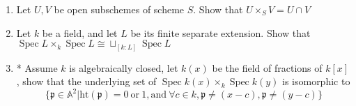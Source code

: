 \documentclass[a4paper,11pt]{article}
\def\bb#1{\mathbb{#1}}
\def\mrm#1{\mathrm{#1}}
\DeclareMathOperator{\Spec}{Spec}
\begin{document}
\begin{enumerate}[1.]
\begin{enumerate}
    \item Let $U,V$ be open subschemes of scheme $S$. Show that $U\times_S V=U\cap V$
    \item Let $k$ be a field, and let $L$ be its finite separate extension. Show that $\Spec L \times_k \Spec L \cong \sqcup_{[k:L]}\Spec L$
    \item* Assume $k$ is algebraically closed, let $k(x)$ be the field of fractions of $k[x]$, show that the underlying set of
    $\Spec k(x) \times_k \Spec k(y)$ is isomorphic to
    \[ \{\mathfrak{p}\in\bb{A}^2| \mathrm{ht}(\mathfrak{p})=0\ \mathrm{or}\ 1,\mrm{and\ }\forall c\in k, \mathfrak{p}\neq (x-c),\mathfrak{p}\neq(y-c)\}\]
\end{enumerate}

\begin{comment}
\item Let $A\to B$ be a integral extension, and let $\mathfrak{p}$ be a prime ideal of $B$
\begin{enumerate}
    \item Show that for any prime ideal $\mathfrak{q}$ of $B$ such that $\mathfrak{p}\cap A\subset\mathfrak{q}\subset \mathfrak{p}$, then $\mathfrak{q}= \mathfrak{p}$
    \item* Use induction to show that $\mathrm{ht}(\mathfrak{p}\subset B)=\mathrm{ht}(\mathfrak{p}\cap A\subset A)$
\end{enumerate}
\end{comment}

\end{enumerate}
\end{document}

